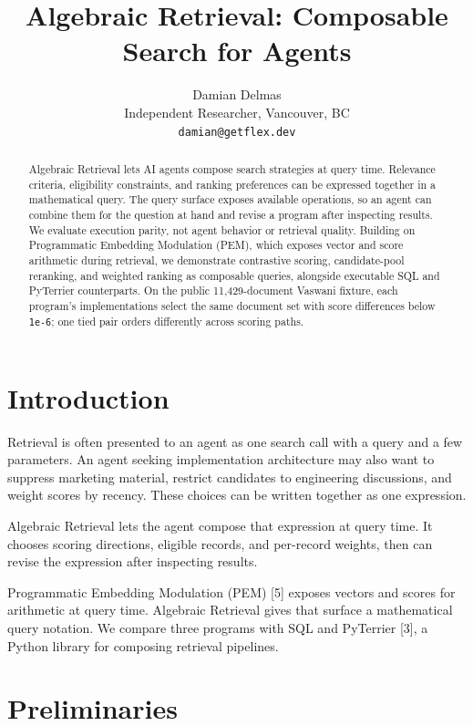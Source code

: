\documentclass{article}
\title{Algebraic Retrieval: Composable Search for Agents}
\author{Damian Delmas \\
Independent Researcher, Vancouver, BC \\
\texttt{damian@getflex.dev}}
\date{}
\begin{document}
\maketitle
\begin{abstract}
Algebraic Retrieval lets AI agents compose search strategies at query time. Relevance criteria, eligibility constraints, and ranking preferences can be expressed together in a mathematical query. The query surface exposes available operations, so an agent can combine them for the question at hand and revise a program after inspecting results. We evaluate execution parity, not agent behavior or retrieval quality. Building on Programmatic Embedding Modulation (PEM), which exposes vector and score arithmetic during retrieval, we demonstrate contrastive scoring, candidate-pool reranking, and weighted ranking as composable queries, alongside executable SQL and PyTerrier counterparts. On the public 11,429-document Vaswani fixture, each program's implementations select the same document set with score differences below \texttt{1e-6}; one tied pair orders differently across scoring paths.
\end{abstract}

\hypertarget{introduction}{%
\section{Introduction}\label{introduction}}

Retrieval is often presented to an agent as one search call with a query and a few parameters. An agent seeking implementation architecture may also want to suppress marketing material, restrict candidates to engineering discussions, and weight scores by recency. These choices can be written together as one expression.

Algebraic Retrieval lets the agent compose that expression at query time. It chooses scoring directions, eligible records, and per-record weights, then can revise the expression after inspecting results.

Programmatic Embedding Modulation (PEM) {[}5{]} exposes vectors and scores for arithmetic at query time. Algebraic Retrieval gives that surface a mathematical query notation. We compare three programs with SQL and PyTerrier {[}3{]}, a Python library for composing retrieval pipelines.

\hypertarget{preliminaries}{%
\section{Preliminaries}\label{preliminaries}}
\end{document}

